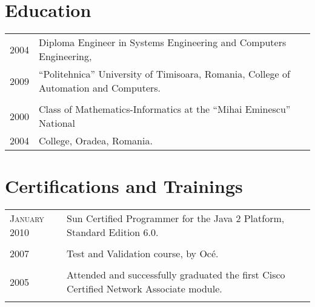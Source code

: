 \documentclass[a4paper,10pt]{article}
\begin{document}
\section{Education}
\begin{tabular}{p{2.5cm}|p{11cm}}
\raggedleft \textsc{2004} & Diploma Engineer in Systems Engineering and
Computers Engineering, \\ \raggedleft \textsc{2009} & ``Politehnica'' University of Timisoara, Romania, College of Automation and
Computers.
\\\multicolumn{2}{c}{} \\ \raggedleft \textsc{2000} & Class of Mathematics-Informatics at the
``Mihai Eminescu'' National \\ \raggedleft \textsc{2004} &
College, Oradea, Romania.\\
\end{tabular}

\section{Certifications and Trainings}
\begin{tabular}{p{2.5cm}|p{11cm}}
\raggedleft \textsc{January 2010} & Sun Certified Programmer for the Java 2
Platform, Standard Edition 6.0. 
\\
\multicolumn{2}{c}{}
\\
 \raggedleft \textsc{2007} & Test and Validation course, by Oc\'e.\\
\multicolumn{2}{c}{} 
\\ 
\raggedleft  \textsc{2005} & Attended and successfully
graduated the first Cisco Certified Network Associate module.\\ \multicolumn{2}{c}{} \\
\end{tabular}

\end{document}
